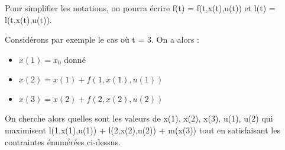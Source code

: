 \documentclass[10pt]{article}
\begin{document}
Pour simplifier les notations, on pourra écrire f(t) = f(t,x(t),u(t)) et l(t) = l(t,x(t),u(t)).

Considérons par exemple le cas où t = 3.
On a alors :
\begin{itemize}
     \setlength{\itemsep}{1pt}
     \setlength{\parskip}{0pt}
     \setlength{\parsep}{0pt}
\item \( x(1) = x_0 \) donné
\item \( x(2) = x(1) + f(1,x(1),u(1)) \)
\item \( x(3) = x(2) + f(2,x(2),u(2)) \)
\end{itemize}

On cherche alors quelles sont les valeurs de x(1), x(2), x(3), u(1), u(2) qui maximisent l(1,x(1),u(1)) + l(2,x(2),u(2)) + m(x(3)) tout en satisfaisant les contraintes énumérées ci-dessus.
\end{document}
